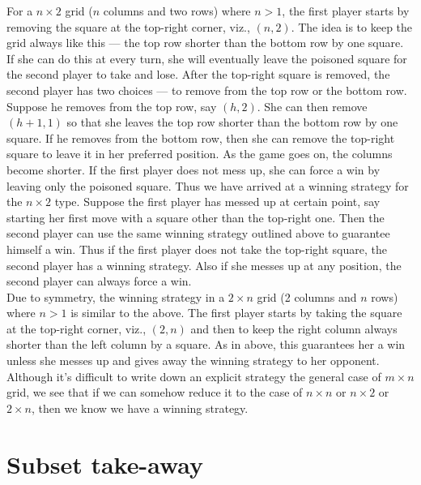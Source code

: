 \documentclass[a4paper, 12pt]{article}
\theoremstyle{remark} %
\begin{document}
For a $n\times 2$ grid ($n$ columns and two rows) where $n>1$, the first player starts by removing the square at the top-right corner, viz., $(n,2)$. The idea is to keep the grid always like this --- the top row shorter than the bottom row by one square. If she can do this at every turn, she will eventually leave the poisoned square for the second player to take and lose. After the top-right square is removed, the second player has two choices --- to remove from the top row or the bottom row. Suppose he removes from the top row, say $(h,2)$. She can then remove $(h+1,1)$ so that she leaves the top row shorter than the bottom row by one square. If he removes from the bottom row, then she can remove the top-right square to leave it in her preferred position. As the game goes on, the columns become shorter. If the first player does not mess up, she can force a win by leaving only the poisoned square. Thus we have arrived at a winning strategy for the $n\times 2$ type. Suppose the first player has messed up at certain point, say starting her first move with a square other than the top-right one. Then the second player can use the same winning strategy outlined above to guarantee himself a win. Thus if the first player does not take the top-right square, the second player has a winning strategy. Also if she messes up at any position, the second player can always force a win.\\

Due to symmetry, the winning strategy in a $2 \times n$ grid (2 columns and $n$ rows) where $n>1$ is similar to the above. The first player starts by taking the square at the top-right corner, viz., $(2,n)$ and then to keep the right column always shorter than the left column by a square. As in above, this guarantees her a win unless she messes up and gives away the winning strategy to her opponent.\\

Although it's difficult to write down an explicit strategy the general case of $m \times n$ grid, we see that if we can somehow reduce it to the case of $n\times n$ or $n\times 2$ or $2\times n$, then we know we have a winning strategy.

\section{Subset take-away}
\label{subsettakeaway}
\end{document}
